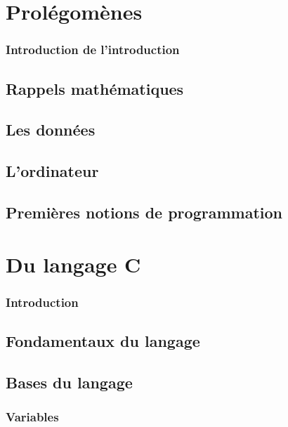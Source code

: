 \documentclass{minitelreport}
\begin{document}
\begin{refsection}
\part{Prolégomènes}
\label{part:prol_gom_nes}
	\section*{Introduction de l'introduction}
	
	\chapter{Rappels mathématiques}
	\label{cha:rappels_math_matiques}
		
	\chapter{Les données}
	\label{cha:les_donn_es}
		
	\chapter{L'ordinateur}
	\label{cha:l_ordinateur}
		
	\chapter{Premières notions de programmation}
	\label{cha:programmer_un_ordinateur}
		
\part{Du langage C}
\label{part:du_langage_c}
	\section*{Introduction}
	
	\chapter{Fondamentaux du langage}
	\label{chap:fondamentaux_du_langage}
		
	\chapter{Bases du langage}
	\label{chap:bases_du_langage}
		\section{Variables}
			\label{sec:variables}
			

\end{refsection}
\end{document}
